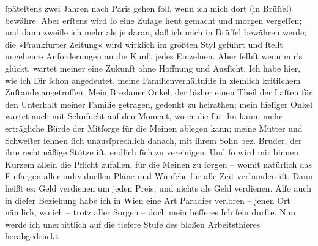 \begin{ledgroupsized}[t]{13cm}
               ſpäteſtens zwei Jahren nach Paris gehen ſoll,
               wenn ich mich dort (in Brüſſel)
                  bewähre\textcolor{gray}{.} Aber erſtens wird ſo eine Zuſage heut gemacht und
               morgen vergeſſen; und dann zweifle ich mehr als je daran, daß ich mich in Brüſſel bewähren {\pb}werde; die »Frankfurter Zeitung« wird wirklich
               im größten Styl geführt und ſtellt ungeheure Anforderungen an die Kunft jedes
               Einzelnen. Aber ſelbſt wenn mir’s glückt, wartet meiner eine Zukunft ohne Hoffnung
               und Ausſicht. Ich habe hier,
               wie ich Dir ſchon angedeutet, meine Familienverhältniſſe in ziemlich kritiſchem
               Zuſtande angetroffen. Mein Breslauer Onkel, der bisher einen Theil
               der Laſten für den Unterhalt meiner Familie getragen, gedenkt zu heirathen; mein
               hieſiger Onkel
               wartet auch mit Sehnſucht auf den Moment, wo er die für ihn kaum mehr erträgliche
               Bürde der Mitſorge für die Meinen ablegen kann; meine Mutter und Schweſter ſehnen ſich unausſprechlich
               danach, mit ihrem Sohn bez. Bruder, der ihre rechtmäßige Stütze iſt, endlich ſich {\pb}zu vereinigen. Und ſo wird mir binnen Kurzem allein
               die Pflicht zufallen, für die Meinen zu ſorgen – womit natürlich das Einſargen aller
               individuellen Pläne und Wünſche für alle Zeit verbunden iſt. Dann heißt es: Geld
               verdienen um jeden Preis, und nichts als Geld verdienen. Alſo auch in dieſer
               Beziehung habe ich in Wien eine Art Paradies
               verloren – jenen Ort nämlich, wo
               ich – trotz aller Sorgen – doch mein beſſeres Ich ſein durfte. Nun werde ich
               unerbittlich auf die tiefere Stufe des bloßen Arbeitsthieres herabgedrückt{\dotsfive}\pend
           \pstart

\end{ledgroupsized}

